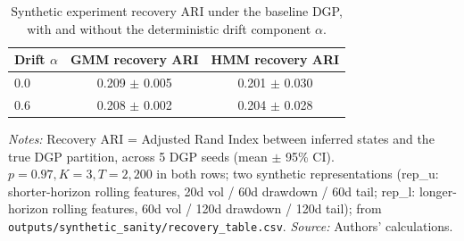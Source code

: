 \documentclass[preprint,12pt,authoryear]{elsarticle}
\begin{document}
\begin{table}[!htbp]
\centering
\small
\setlength{\tabcolsep}{4pt}
\caption{Synthetic experiment recovery ARI under the baseline DGP, with and without the deterministic drift component $\alpha$.}
\label{tab:synth_robustness}
\begin{tabular}{lcc}
\toprule
Drift $\alpha$ & GMM recovery ARI & HMM recovery ARI \\
\midrule
0.0 & 0.209 $\pm$ 0.005 & 0.201 $\pm$ 0.030 \\
0.6 & 0.208 $\pm$ 0.002 & 0.204 $\pm$ 0.028 \\
\bottomrule
\end{tabular}
\par\medskip
\footnotesize
\parbox{\linewidth}{\textit{Notes:} Recovery ARI = Adjusted Rand Index between inferred states and the true DGP partition, across 5 DGP seeds (mean $\pm$ 95\% CI). $p=0.97, K=3, T=2{,}200$ in both rows; two synthetic representations (rep\_u: shorter-horizon rolling features, 20d vol / 60d drawdown / 60d tail; rep\_l: longer-horizon rolling features, 60d vol / 120d drawdown / 120d tail); from \texttt{outputs/synthetic\_sanity/recovery\_table.csv}. \textit{Source:} Authors' calculations.}
\end{table}
\end{document}
